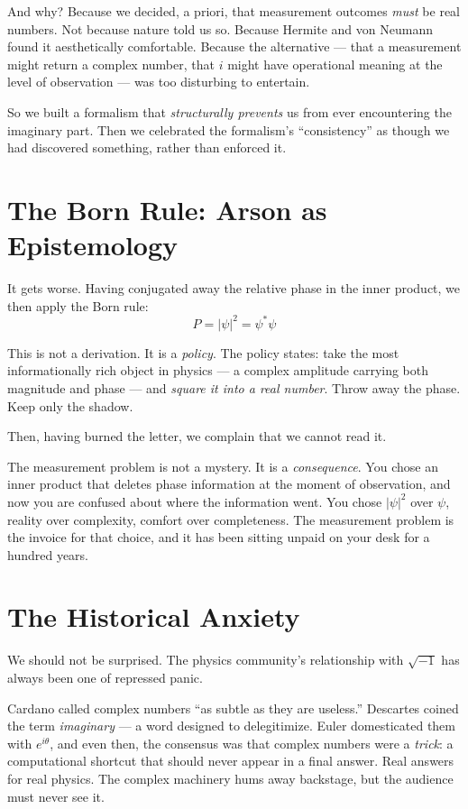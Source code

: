 \documentclass[11pt]{article}
\begin{document}
And why? Because we decided, a priori, that measurement outcomes \textit{must} be real numbers. Not because nature told us so. Because Hermite and von Neumann found it aesthetically comfortable. Because the alternative --- that a measurement might return a complex number, that $i$ might have operational meaning at the level of observation --- was too disturbing to entertain.

So we built a formalism that \textit{structurally prevents} us from ever encountering the imaginary part. Then we celebrated the formalism's ``consistency'' as though we had discovered something, rather than enforced it.

\section*{The Born Rule: Arson as Epistemology}

It gets worse. Having conjugated away the relative phase in the inner product, we then apply the Born rule:
\[
P = |\psi|^2 = \psi^* \psi
\]

This is not a derivation. It is a \textit{policy}. The policy states: take the most informationally rich object in physics --- a complex amplitude carrying both magnitude and phase --- and \textit{square it into a real number}. Throw away the phase. Keep only the shadow.

Then, having burned the letter, we complain that we cannot read it.

The measurement problem is not a mystery. It is a \textit{consequence}. You chose an inner product that deletes phase information at the moment of observation, and now you are confused about where the information went. You chose $|\psi|^2$ over $\psi$, reality over complexity, comfort over completeness. The measurement problem is the invoice for that choice, and it has been sitting unpaid on your desk for a hundred years.

\section*{The Historical Anxiety}

We should not be surprised. The physics community's relationship with $\sqrt{-1}$ has always been one of repressed panic.

Cardano called complex numbers ``as subtle as they are useless.'' Descartes coined the term \textit{imaginary} --- a word designed to delegitimize. Euler domesticated them with $e^{i\theta}$, and even then, the consensus was that complex numbers were a \textit{trick}: a computational shortcut that should never appear in a final answer. Real answers for real physics. The complex machinery hums away backstage, but the audience must never see it.
\end{document}

